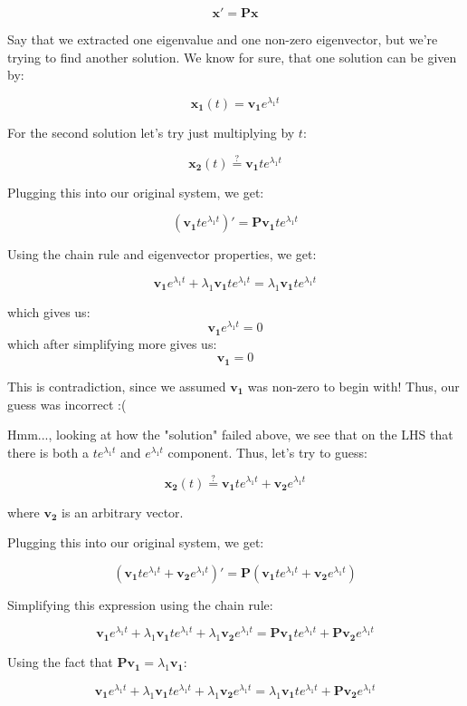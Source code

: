 \documentclass{report}
\begin{document}
$$\mathbf{x'} = \mathbf{Px}$$

Say that we extracted one eigenvalue and one non-zero eigenvector, but we're trying to find another solution. We know for sure, that one solution can be given by:

$$\mathbf{x_1}(t) = \mathbf{v_1}e^{\lambda_1 t}$$

For the second solution let's try just multiplying by $t$:

$$\mathbf{x_2}(t) \stackrel{?}{=} \mathbf{v_1}te^{\lambda_1 t}$$


Plugging this into our original system, we get:

$$(\mathbf{v_1}te^{\lambda_1 t})' = \mathbf{P}\mathbf{v_1}te^{\lambda_1 t}$$

Using the chain rule and eigenvector properties, we get:

$$\mathbf{v_1}e^{\lambda_1 t} + \lambda_1\mathbf{v_1}te^{\lambda_1 t} = \lambda_1 \mathbf{v_1}te^{\lambda_1 t}$$

which gives us:
$$\mathbf{v_1}e^{\lambda_1 t} = 0$$
which after simplifying more gives us:
$$\mathbf{v_1} = 0$$

This is contradiction, since we assumed $\mathbf{v_1}$ was non-zero to begin with! Thus, our guess was incorrect :(


Hmm..., looking at how the "solution" failed above, we see that on the LHS that there is both a $te^{\lambda_1 t}$ and $e^{\lambda_1 t}$ component. Thus, let's try to guess:


$$\mathbf{x_2}(t) \stackrel{?}{=} \mathbf{v_1}te^{\lambda_1 t} + \mathbf{v_2}e^{\lambda_1 t}$$

where $\mathbf{v_2}$ is an arbitrary vector.

Plugging this into our original system, we get:


$$(\mathbf{v_1}te^{\lambda_1 t} + \mathbf{v_2}e^{\lambda_1 t})' = \mathbf{P}(\mathbf{v_1}te^{\lambda_1 t} + \mathbf{v_2}e^{\lambda_1 t})$$

Simplifying this expression using the chain rule:

$$\mathbf{v_1}e^{\lambda_1 t} + \lambda_1\mathbf{v_1}te^{\lambda_1 t} + \lambda_1\mathbf{v_2}e^{\lambda_1 t} = \mathbf{P}\mathbf{v_1}te^{\lambda_1 t} + \mathbf{P}\mathbf{v_2}e^{\lambda_1 t}$$

Using the fact that $\mathbf{P}\mathbf{v_1} = \lambda_1\mathbf{v_1}$:

$$\mathbf{v_1}e^{\lambda_1 t} + \lambda_1\mathbf{v_1}te^{\lambda_1 t} + \lambda_1\mathbf{v_2}e^{\lambda_1 t} = \lambda_1\mathbf{v_1}te^{\lambda_1 t} + \mathbf{P}\mathbf{v_2}e^{\lambda_1 t}$$
\end{document}
